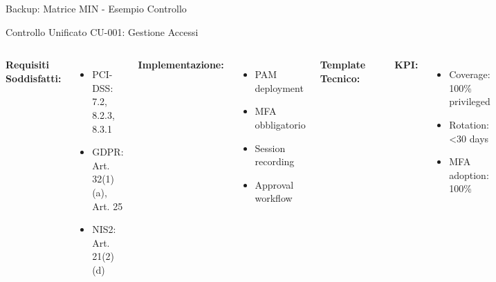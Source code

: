 \documentclass[aspectratio=169,10pt]{beamer}
\begin{document}
\begin{frame}{Backup: Matrice MIN - Esempio Controllo}
\begin{exampleblock}{Controllo Unificato CU-001: Gestione Accessi}
\begin{columns}[T]
\textbf{Requisiti Soddisfatti:}
\begin{itemize}
    \item PCI-DSS: 7.2, 8.2.3, 8.3.1
    \item GDPR: Art. 32(1)(a), Art. 25
    \item NIS2: Art. 21(2)(d)
\end{itemize}

\textbf{Implementazione:}
\begin{itemize}
    \item PAM deployment
    \item MFA obbligatorio
    \item Session recording
    \item Approval workflow
\end{itemize}

\textbf{Template Tecnico:}
\begin{lstlisting}[language=bash,basicstyle=\tiny\ttfamily]
# Deploy PAM
kubectl apply -f pam-deployment.yaml

# Configure policies
pam-cli policy create \
  --rotation 30d \
  --mfa required \
  --recording enabled \
  --approval manager

# Integration
pam-cli integrate \
  --ldap $LDAP_URL \
  --siem $SIEM_ENDPOINT
\end{lstlisting}

\textbf{KPI:}
\begin{itemize}
    \item Coverage: 100\% privileged
    \item Rotation: <30 days
    \item MFA adoption: 100\%
\end{itemize}
\end{columns}
\end{exampleblock}
\end{frame}
\end{document}
